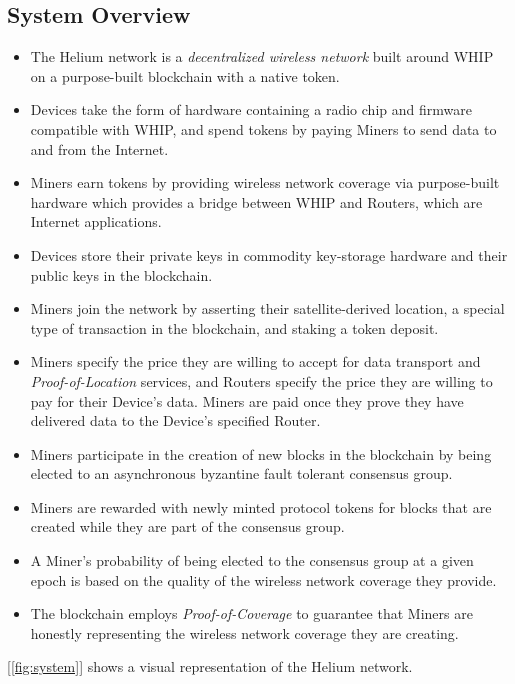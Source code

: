 \documentclass[10pt, nonatbib, nocopyrightspace, reprint]{sigplanconf}
\newcommand{\figref}[1]{[\autoref{#1}]}
\begin{document}
\subsection{System Overview}

\begin{itemize}
    \item The Helium network is a \emph{decentralized wireless network} built around WHIP on a purpose-built blockchain with a native token.
    \item Devices take the form of hardware containing a radio chip and firmware compatible with WHIP, and spend tokens by paying Miners to send data to and from the Internet.
    \item Miners earn tokens by providing wireless network coverage via purpose-built hardware which provides a bridge between WHIP and Routers, which are Internet applications.
    \item Devices store their private keys in commodity key-storage hardware and their public keys in the blockchain.
    \item Miners join the network by asserting their satellite-derived location, a special type of transaction in the blockchain, and staking a token deposit.
    \item Miners specify the price they are willing to accept for data transport and \emph{Proof-of-Location} services, and Routers specify the price they are willing to pay for their Device's data. Miners are paid once they prove they have delivered data to the Device's specified Router.
    \item Miners participate in the creation of new blocks in the blockchain by being elected to an asynchronous byzantine fault tolerant consensus group.
    \item Miners are rewarded with newly minted protocol tokens for blocks that are created while they are part of the consensus group.
    \item A Miner's probability of being elected to the consensus group at a given epoch is based on the quality of the wireless network coverage they provide.
    \item The blockchain employs \emph{Proof-of-Coverage} to guarantee that Miners are honestly representing the wireless network coverage they are creating.
\end{itemize}

\figref{fig:system} shows a visual representation of the Helium network.
\end{document}
